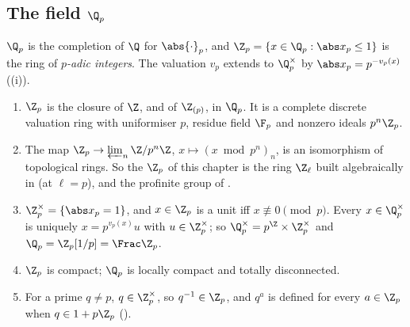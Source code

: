 \subsection{The field \texorpdfstring{$\Q_p$}{Qp}}

\begin{definition}\label{def:local:qp}
$\Q_p$ is the completion of $\Q$ for $\abs{\cdot}_p$, and $\Z_p=\{x\in\Q_p:\abs x_p\le1\}$ is the ring of \emph{$p$-adic integers}. The
valuation $v_p$ extends to $\Q_p^\times$ by $\abs x_p=p^{-v_p(x)}$ ((i)).
\end{definition}

\begin{theorem}\label{thm:local:qp}
\begin{enumerate}[label=(\roman*)]
\item $\Z_p$ is the closure of $\Z$, and of $\Z_{(p)}$, in $\Q_p$. It is a complete discrete valuation ring with uniformiser $p$, residue field
$\F_p$ and nonzero ideals $p^n\Z_p$.
\item The map $\Z_p\to\varprojlim_n\Z/p^n\Z$, $x\mapsto(x\bmod p^n)_n$, is an isomorphism of topological rings. So the $\Z_p$ of this chapter is the
ring $\Z_\ell$ built algebraically in  (at $\ell=p$), and the profinite group of .
\item $\Z_p^\times=\{\abs x_p=1\}$, and $x\in\Z_p$ is a unit iff $x\not\equiv0\pmod p$. Every $x\in\Q_p^\times$ is uniquely $x=p^{v_p(x)}u$ with
$u\in\Z_p^\times$; so $\Q_p^\times=p^{\Z}\times\Z_p^\times$ and $\Q_p=\Z_p[1/p]=\Frac\Z_p$.
\item $\Z_p$ is compact; $\Q_p$ is locally compact and totally disconnected.
\item For a prime $q\ne p$, $q\in\Z_p^\times$, so $q^{-1}\in\Z_p$, and $q^{a}$ is defined for every $a\in\Z_p$ when $q\in1+p\Z_p$
().
\end{enumerate}
\end{theorem}

